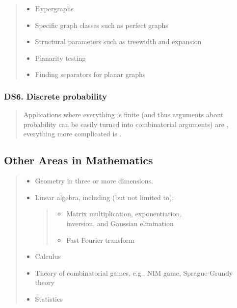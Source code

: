 \documentclass[a4paper,11pt,oneside]{article}
\newcommand{\xmark}{\ding{55}}%
\newcommand{\cnfoc}{{\small\faQuestion}}
\newcommand{\cexcl}{{\small\xmark}}
\newcommand{\Iexcluded}{\item[\hbox to 1.8em{\cexcl\hfill}]}
\newenvironment{myitemize}{\begin{quote}\begin{itemize}\itemsep 0pt}{\end{itemize}\end{quote}}
\begin{document}
        \begin{myitemize}
        \Iexcluded Hypergraphs
        \Iexcluded Specific graph classes such as perfect graphs
        \Iexcluded Structural parameters such as treewidth and expansion
        \Iexcluded Planarity testing
        \Iexcluded Finding separators for planar graphs
        \end{myitemize}

    \subsubsection*{DS6. Discrete probability}
  
        \begin{quote}
        Applications where everything is finite (and thus arguments about probability can be easily
        turned into combinatorial arguments) are \cnfoc, everything more complicated
        is \cexcl.
        \end{quote}

\subsection {Other Areas in Mathematics}%
\label{subsubsec:other-mathematics}

    \begin{myitemize}
    \Iexcluded Geometry in three or more dimensions.
    \Iexcluded  Linear algebra, including (but not limited to):
        \begin{myitemize}
        \item Matrix multiplication, exponentiation, \\
              inversion, and Gaussian elimination
        \item Fast Fourier transform
        \end{myitemize}
    \Iexcluded Calculus
    \Iexcluded Theory of combinatorial games, e.g., NIM game, Sprague-Grundy theory
    \Iexcluded Statistics
    \end{myitemize}

\end{document}
